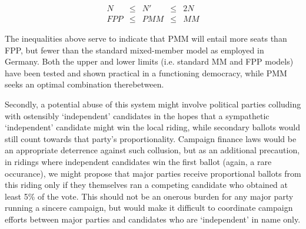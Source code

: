 \documentclass[DIV=calc, paper=a4, fontsize=11pt, twocolumn]{scrartcl}	 %
\begin{document}
\begin{align}
\label{eq:Nlimits}
N &\le& N' &\le& 2N \\
FPP &\le& PMM &\le& MM
\end{align}

The inequalities above serve to indicate that PMM will entail more seats than FPP, but fewer than the standard mixed-member model as employed in Germany. Both the upper and lower limits (i.e. standard MM and FPP models) have been tested and shown practical in a functioning democracy, while PMM seeks an optimal combination therebetween.

Secondly, a potential abuse of this system might involve political parties colluding with ostensibly `independent' candidates in the hopes that a sympathetic `independent' candidate might win the local riding, while secondary ballots would still count towards that party's proportionality. Campaign finance laws would be an appropriate deterrence against such collusion, but as an additional precaution, in ridings where independent candidates win the first ballot (again, a rare occurance), we might propose that major parties receive proportional ballots from this riding only if they themselves ran a competing candidate who obtained at least 5\% of the vote. This should not be an onerous burden for any major party running a sincere campaign, but would make it difficult to coordinate campaign efforts between major parties and candidates who are `independent' in name only.

\end{document}
